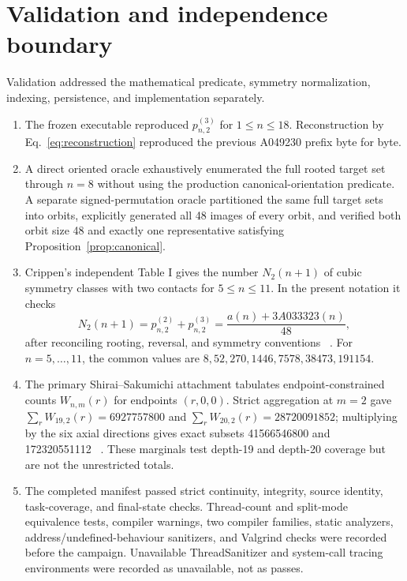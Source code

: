\documentclass[11pt]{article}
\theoremstyle{definition}
\theoremstyle{remark}
\begin{document}
\section{Validation and independence boundary}

Validation addressed the mathematical predicate, symmetry normalization,
indexing, persistence, and implementation separately.

\begin{enumerate}
\item The frozen executable reproduced $p_{n,2}^{(3)}$ for $1\leq n\leq18$.
  Reconstruction by Eq.~\eqref{eq:reconstruction} reproduced the previous
  A049230 prefix byte for byte.
\item A direct oriented oracle exhaustively enumerated the full rooted target
  set through $n=8$ without using the production canonical-orientation
  predicate.  A separate signed-permutation oracle partitioned the same full
  target sets into orbits, explicitly generated all 48 images of every orbit,
  and verified both orbit size 48 and exactly one representative satisfying
  Proposition~\ref{prop:canonical}.
\item Crippen's independent Table I gives the number $N_2(n+1)$ of cubic
  symmetry classes with two contacts for $5\leq n\leq11$.  In the present
  notation it checks
  \[
    N_2(n+1)=p_{n,2}^{(2)}+p_{n,2}^{(3)}
            =\frac{a(n)+3A033323(n)}{48},
  \]
  after reconciling rooting, reversal, and symmetry conventions~
  \cite{Crippen2000}.  For $n=5,\ldots,11$, the common values are
  $8,52,270,1446,7578,38473,191154$.
\item The primary Shirai--Sakumichi attachment tabulates endpoint-constrained
  counts $W_{n,m}(r)$ for endpoints $(r,0,0)$.  Strict aggregation at $m=2$
  gave $\sum_rW_{19,2}(r)=6927757800$ and
  $\sum_rW_{20,2}(r)=28720091852$; multiplying by the six axial directions
  gives exact subsets 41566546800 and 172320551112~
  \cite{ShiraiSakumichi2023}.  These marginals test depth-19 and depth-20
  coverage but are not the unrestricted totals.
\item The completed manifest passed strict continuity, integrity, source
  identity, task-coverage, and final-state checks.  Thread-count and split-mode
  equivalence tests, compiler warnings, two compiler families, static
  analyzers, address/undefined-behaviour sanitizers, and Valgrind checks were
  recorded before the campaign.  Unavailable ThreadSanitizer and system-call
  tracing environments were recorded as unavailable, not as passes.
\end{enumerate}
\end{document}
